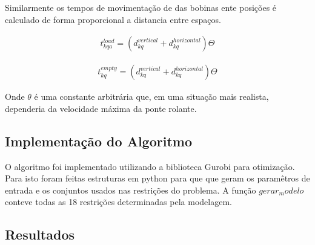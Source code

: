 \documentclass[journal]{IEEEtran}
\begin{document}
        Similarmente os tempos de movimentação de das bobinas ente posições é 
        calculado de forma proporcional a distancia entre espaços. 

        \begin{align}
            t^{load}_{kqa} = (d^{vertical}_{kq} + d^{horizontal}_{kq}) \Theta
        \end{align}

        \begin{align}
            t^{empty}_{kq} = (d^{vertical}_{kq} + d^{horizontal}_{kq}) \Theta
        \end{align}

        Onde $\theta$ é uma constante arbitrária que, em uma situação mais realista,
        dependeria da velocidade máxima da ponte rolante.

    \subsection{Implementação do Algoritmo}
    
    O algoritmo foi implementado utilizando a biblioteca Gurobi para otimização.
    Para isto foram feitas estruturas em python para que que geram os paramêtros 
    de entrada e os conjuntos usados nas restrições do problema. A função $gerar_modelo$
    conteve todas as 18 restrições determinadas pela modelagem.
    
    \subsection{Resultados}
\end{document}
